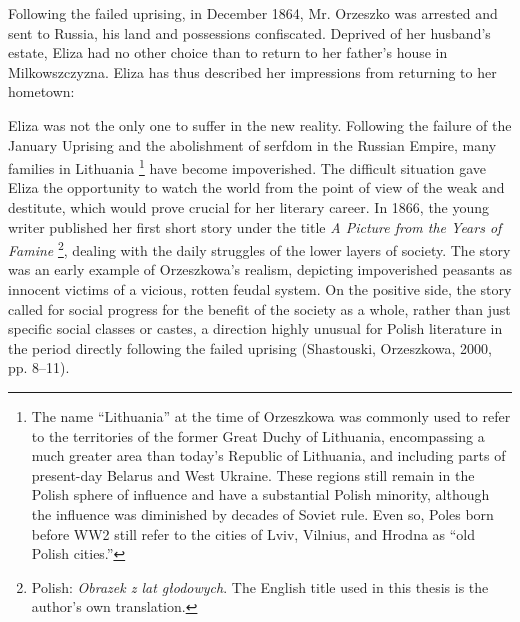 Following the failed uprising, in December 1864, Mr. Orzeszko was arrested and sent to Russia, his land and possessions confiscated.
Deprived of her husband's estate, Eliza had no other choice than to return to her father's house in Milkowszczyzna.
Eliza has thus described her impressions from returning to her hometown:


Eliza was not the only one to suffer in the new reality.
Following the failure of the January Uprising and the abolishment of serfdom in the Russian Empire, many families in Lithuania%
\footnote{The name ``Lithuania'' at the time of Orzeszkowa was commonly used to refer to the territories of the former Great Duchy of Lithuania, encompassing a much greater area than today's Republic of Lithuania, and including parts of present-day Belarus and West Ukraine. These regions still remain in the Polish sphere of influence and have a substantial Polish minority, although the influence was diminished by decades of Soviet rule. Even so, Poles born before WW2 still refer to the cities of Lviv, Vilnius, and Hrodna as ``old Polish cities.''}
have become impoverished.
The difficult situation gave Eliza the opportunity to watch the world from the point of view of the weak and destitute, which would prove crucial for her literary career.
In 1866, the young writer published her first short story under the title \textit{A Picture from the Years of Famine}%
\footnote{Polish: \textit{Obrazek z lat głodowych}. The English title used in this thesis is the author's own translation.}, dealing with the daily struggles of the lower layers of society.
The story was an early example of Orzeszkowa's realism, depicting impoverished peasants as innocent victims of a vicious, rotten feudal system.
On the positive side, the story called for social progress for the benefit of the society as a whole, rather than just specific social classes or castes, a direction highly unusual for Polish literature in the period directly following the failed uprising
(Shastouski, Orzeszkowa, 2000, pp. 8--11).

